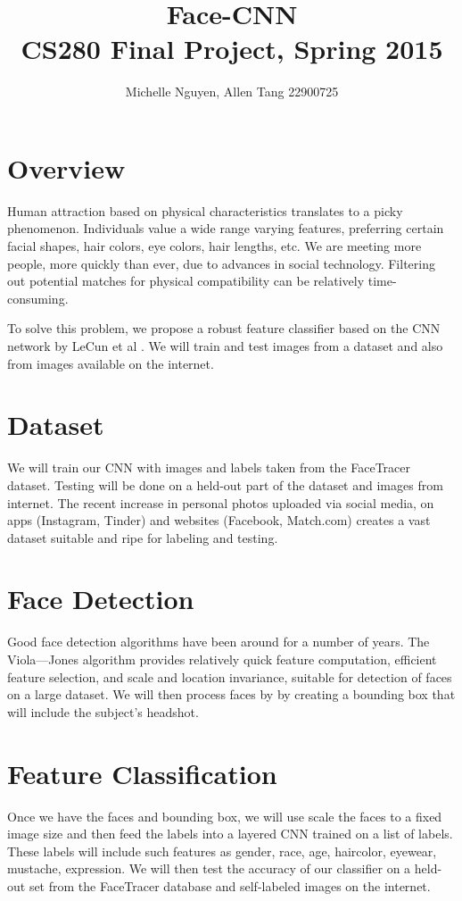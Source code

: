 \documentclass[letterpaper,10pt, twocolumn]{article}
\begin{document}
\title{\vspace{-2.5cm} \textbf{Face-CNN} \\ \normalsize CS280 Final Project, Spring 2015}
\author{Michelle Nguyen, Allen Tang 22900725}
\date{}

\maketitle

\section{Overview}
	Human attraction based on physical characteristics translates to a picky phenomenon. Individuals value a wide range varying features, preferring certain facial shapes, hair colors, eye colors, hair lengths, etc. We are meeting more people, more quickly than ever, due to advances in social technology. Filtering out potential matches for physical compatibility can be relatively time-consuming.
	
	To solve this problem, we propose a robust feature classifier based on the CNN network by LeCun et al \cite{LeCun}. We will train and test images from a dataset and also from images available on the internet.

\section{Dataset}
We will train our CNN with images and labels taken from the FaceTracer dataset\cite{FaceTracer}. Testing will be done on a held-out part of the dataset and images from internet. The recent increase in personal photos uploaded via social media, on apps (Instagram, Tinder) and websites (Facebook, Match.com) creates a vast dataset suitable and ripe for labeling and testing.


\section{Face Detection}
	Good face detection algorithms have been around for a number of years. The Viola–--Jones algorithm provides relatively quick feature computation, efficient feature selection, and scale and location invariance, suitable for detection of faces on a large dataset.  We will then process faces by by creating a bounding box that will include the subject's headshot.

\section{Feature Classification}
	Once we have the faces and bounding box, we will use scale the faces to a fixed image size and then feed the labels into a layered CNN trained on a list of labels. These labels will include such features as gender, race, age, hair\textunderscore color, eye\textunderscore wear, mustache, expression. We will then test the accuracy of our classifier on a held-out set from the FaceTracer database and self-labeled images on the internet.
\end{document}
